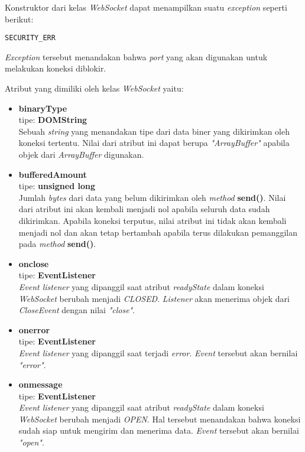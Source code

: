 Konstruktor dari kelas \textit{WebSocket} dapat menampilkan suatu \textit{exception} seperti berikut:

\begin{lstlisting}
SECURITY_ERR
\end{lstlisting}

\textit{Exception} tersebut menandakan bahwa \textit{port} yang akan digunakan untuk melakukan koneksi diblokir.

Atribut yang dimiliki oleh kelas \textit{WebSocket} yaitu:

\begin{itemize}
	\item \textbf{binaryType} \\ tipe: \textbf{DOMString} \\ Sebuah \textit{string} yang menandakan tipe dari data biner yang dikirimkan oleh koneksi tertentu. Nilai dari atribut ini dapat berupa \textit{"ArrayBuffer"} apabila objek dari \textit{ArrayBuffer} digunakan.
	
	\item \textbf{bufferedAmount} \\ tipe: \textbf{unsigned long} \\ Jumlah \textit{bytes} dari data yang belum dikirimkan oleh \textit{method} \textbf{send()}. Nilai dari atribut ini akan kembali menjadi nol apabila seluruh data sudah dikirimkan. Apabila koneksi terputus, nilai atribut ini tidak akan kembali menjadi nol dan akan tetap bertambah apabila terus dilakukan pemanggilan pada \textit{method} \textbf{send()}.
	
	\item \textbf{onclose} \\ tipe: \textbf{EventListener} \\ \textit{Event listener} yang dipanggil saat atribut \textit{readyState} dalam koneksi \textit{WebSocket} berubah menjadi \textit{CLOSED}. \textit{Listener} akan menerima objek dari \textit{CloseEvent} dengan nilai \textit{"close"}.
	
	\item \textbf{onerror} \\ tipe: \textbf{EventListener} \\ \textit{Event listener} yang dipanggil saat terjadi \textit{error}. \textit{Event} tersebut akan bernilai \textit{"error"}.
	
	\item \textbf{onmessage} \\ tipe: \textbf{EventListener} \\ \textit{Event listener} yang dipanggil saat atribut \textit{readyState} dalam koneksi \textit{WebSocket} berubah menjadi \textit{OPEN}. Hal tersebut menandakan bahwa koneksi sudah siap untuk mengirim dan menerima data. \textit{Event} tersebut akan bernilai \textit{"open"}.
	

\end{itemize}
